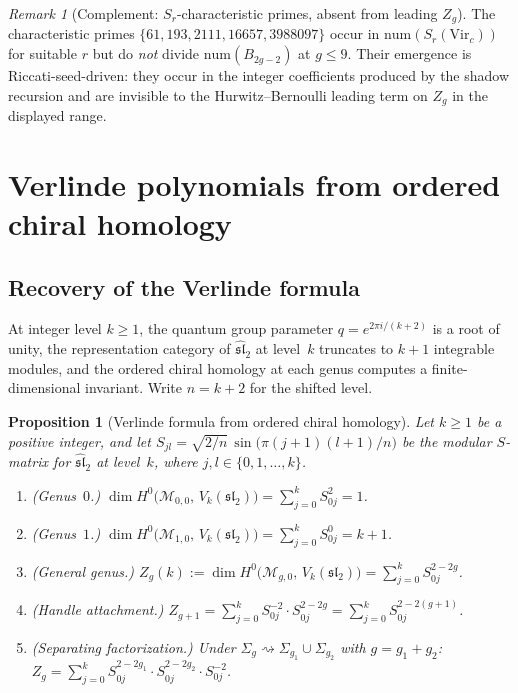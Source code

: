 \documentclass[11pt,reqno]{amsart}
\newtheorem{proposition}[theorem]{Proposition}
\theoremstyle{definition}
\theoremstyle{remark}
\newtheorem{remark}[theorem]{Remark}
\providecommand{\cM}{\mathcal{M}}
\providecommand{\fsl}{\mathfrak{sl}}
\numberwithin{equation}{section}
\begin{document}
\begin{remark}[Complement: $S_r$-characteristic primes, absent from
leading $Z_g$]\label{rem:sr-characteristic-primes}
The characteristic primes $\{61, 193, 2111, 16657, 3988097\}$
occur in $\mathrm{num}(S_r(\mathrm{Vir}_c))$ for suitable $r$ but
do \emph{not} divide $\mathrm{num}(B_{2g-2})$ at $g \le 9$. Their
emergence is Riccati-seed-driven: they occur in the integer
coefficients produced by the shadow recursion and are invisible to
the Hurwitz--Bernoulli leading term on $Z_g$ in the displayed range.
\end{remark}

\section{Verlinde polynomials from ordered chiral homology}
\label{sec:verlinde}

\subsection{Recovery of the Verlinde formula}

At integer level $k \ge 1$, the quantum group parameter
$q = e^{2\pi i/(k+2)}$ is a root of unity, the representation
category of $\widehat{\fsl}_2$ at level~$k$ truncates to $k+1$
integrable modules, and the ordered chiral homology at each genus
computes a finite-dimensional invariant. Write $n = k + 2$ for the
shifted level.

\begin{proposition}[Verlinde formula from ordered chiral
  homology]\label{prop:verlinde-recovery}
  Let $k \ge 1$ be a positive integer, and let
  $S_{jl} = \sqrt{2/n}\,\sin\!\bigl(\pi(j+1)(l+1)/n\bigr)$
  be the modular $S$-matrix for $\widehat{\fsl}_2$ at level~$k$,
  where $j, l \in \{0, 1, \ldots, k\}$.
  \begin{enumerate}[label=\textup{(\roman*)}]
  \item \textup{(Genus~$0$.)}
    $\dim H^0\!\bigl(\cM_{0,0},\, V_k(\fsl_2)\bigr)
    = \sum_{j=0}^{k} S_{0j}^2 = 1$.
  \item \textup{(Genus~$1$.)}
    $\dim H^0\!\bigl(\cM_{1,0},\, V_k(\fsl_2)\bigr)
    = \sum_{j=0}^{k} S_{0j}^0 = k + 1$.
  \item \textup{(General genus.)}
    $Z_g(k) := \dim H^0\!\bigl(\cM_{g,0},\,
    V_k(\fsl_2)\bigr)
    = \sum_{j=0}^{k} S_{0j}^{2-2g}$.
  \item \textup{(Handle attachment.)}
    $Z_{g+1} = \sum_{j=0}^{k} S_{0j}^{-2} \cdot S_{0j}^{2-2g}
    = \sum_{j=0}^{k} S_{0j}^{2-2(g+1)}$.
  \item \textup{(Separating factorization.)}
    Under $\Sigma_g \rightsquigarrow \Sigma_{g_1} \cup \Sigma_{g_2}$
    with $g = g_1 + g_2$:
    $Z_g = \sum_{j=0}^{k} S_{0j}^{2-2g_1} \cdot S_{0j}^{2-2g_2}
    \cdot S_{0j}^{-2}$.
  \end{enumerate}
\end{proposition}
\end{document}
